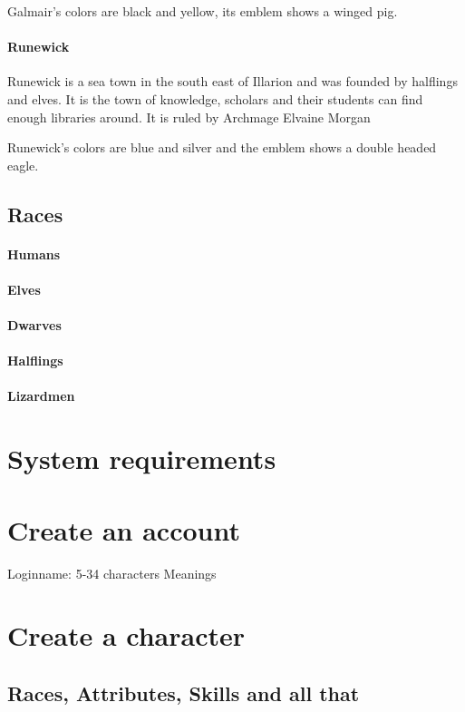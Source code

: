 \documentclass[a4paper,11pt]{scrreprt}
\begin{document}
Galmair's colors are black and yellow, its emblem shows a winged pig. 

\paragraph{Runewick}
Runewick is a sea town in the south east of Illarion and was founded by halflings and elves.
It is the town of knowledge, scholars and their students can find enough libraries around. 
It is ruled by Archmage Elvaine Morgan 

Runewick's colors are blue and silver and the emblem shows a double headed eagle.

\subsection{Races}
\paragraph{Humans}
\paragraph{Elves}
\paragraph{Dwarves}
\paragraph{Halflings}
\paragraph{Lizardmen}


\section{System requirements}
\section{Create an account}
Loginname: 5-34 characters
Meanings
\section{Create a character}
\subsection{Races, Attributes, Skills and all that}
\end{document}

